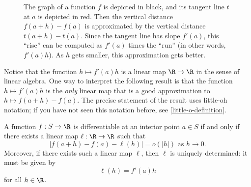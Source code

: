 \begin{figure}
	\begin{center}
	\end{center}
	\caption{The graph of a function $f$ is depicted in black, and its tangent line $t$ at $a$ is depicted in red. Then the vertical distance $f(a+h)-f(a)$ is approximated by the vertical distance $t(a+h)-t(a)$. Since the tangent line has slope $f'(a)$, this ``rise'' can be computed as $f'(a)$ times the ``run'' (in other words, $f'(a)h$). As $h$ gets smaller, this approximation gets better.}  \label{figure-linear-approximation}
\end{figure}

Notice that the function $h \mapsto f'(a)h$ is a linear map $\R \to \R$ in the sense of linear algebra. One way to interpret the following result is that the function $h \mapsto f'(a)h$ is the \emph{only} linear map that is a good approximation to $h \mapsto f(a+h)-f(a)$. The precise statement of the result uses little-oh notation; if you have not seen this notation before, see \cref{little-o-definition}.

\begin{proposition} \label{unique-linear-single-var}
	A function $f : S \to \R$ is differentiable at an interior point $a \in S$ if and only if there exists a linear map $\ell : \R \to \R$ such that
	\[ |f(a+h)-f(a) - \ell(h)| = o(|h|) \text{ as } h \to 0. \]
	Moreover, if there exists such a linear map $\ell$, then $\ell$ is uniquely determined: it must be given by \[ \ell(h) = f'(a)h \]
	for all $h \in \R$. 
\end{proposition}

